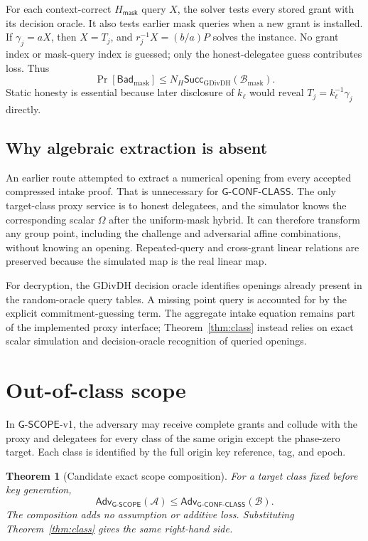 \documentclass[11pt,letterpaper]{article}
\newtheorem{theorem}{Theorem}[section]
\theoremstyle{definition}
\theoremstyle{remark}
\newcommand{\Adv}{\ensuremath{\mathsf{Adv}}}
\newcommand{\Succ}{\ensuremath{\mathsf{Succ}}}
\newcommand{\GClass}{\ensuremath{\mathsf{G\text{-}CONF\text{-}CLASS}}\xspace}
\newcommand{\GScope}{\ensuremath{\mathsf{G\text{-}SCOPE}}\xspace}
\newcommand{\Hmask}{\ensuremath{H_{\mathsf{mask}}}}
\begin{document}
For each context-correct \(\Hmask\) query \(X\), the solver tests every stored
grant with its decision oracle.  It also tests earlier mask queries when a new
grant is installed.  If \(\gamma_j=aX\), then \(X=T_j\), and
\(r_j^{-1}X=(b/a)P\) solves the instance.  No grant index or mask-query index is
guessed; only the honest-delegatee guess contributes loss.  Thus
\[
 \Pr[\mathsf{Bad}_{\mathrm{mask}}]
 \le N_H\Succ_{\mathrm{GDivDH}}(\mathcal B_{\mathrm{mask}}).
\]
Static honesty is essential because later disclosure of \(k_\ell\) would reveal
\(T_j=k_\ell^{-1}\gamma_j\) directly.

\subsection{Why algebraic extraction is absent}

An earlier route attempted to extract a numerical opening from every accepted
compressed intake proof.  That is unnecessary for \GClass.  The only target-class
proxy service is to honest delegatees, and the simulator knows the corresponding
scalar \(\Omega\) after the uniform-mask hybrid.  It can therefore transform any
group point, including the challenge and adversarial affine combinations, without
knowing an opening.  Repeated-query and cross-grant linear relations are preserved
because the simulated map is the real linear map.

For decryption, the GDivDH decision oracle identifies openings already present in
the random-oracle query tables.  A missing point query is accounted for by the
explicit commitment-guessing term.  The aggregate intake equation remains part
of the implemented proxy interface; Theorem~\ref{thm:class} instead relies on
exact scalar simulation and decision-oracle recognition of queried openings.

\section{Out-of-class scope}
\label{sec:scope}

In \GScope-v1, the adversary may receive complete grants and collude with the
proxy and delegatees for every class of the same origin except the phase-zero
target.  Each class is identified by the full origin key reference, tag, and
epoch.

\begin{theorem}[Candidate exact scope composition]
For a target class fixed before key generation,
\[
  \Adv_{\GScope}(\mathcal A)
  \le \Adv_{\GClass}(\mathcal B).
\]
The composition adds no assumption or additive loss.  Substituting
Theorem~\ref{thm:class} gives the same right-hand side.
\end{theorem}
\end{document}
